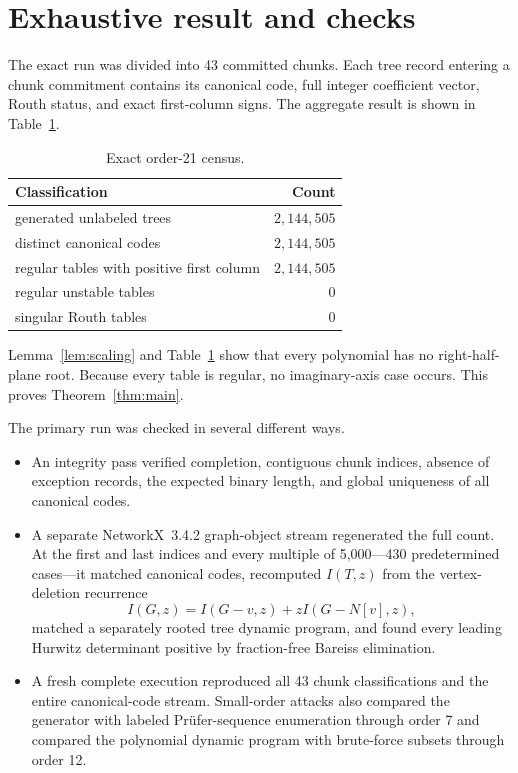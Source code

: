 \documentclass[11pt]{article}
\begin{document}
\section{Exhaustive result and checks}

The exact run was divided into 43 committed chunks.  Each tree record entering
a chunk commitment contains its canonical code, full integer coefficient
vector, Routh status, and exact first-column signs.  The aggregate result is
shown in Table~\ref{tab:census}.

\begin{table}[ht]
\centering
\begin{tabular}{lr}
\toprule
Classification & Count\\
\midrule
generated unlabeled trees & $2{,}144{,}505$\\
distinct canonical codes & $2{,}144{,}505$\\
regular tables with positive first column & $2{,}144{,}505$\\
regular unstable tables & $0$\\
singular Routh tables & $0$\\
\bottomrule
\end{tabular}
\caption{Exact order-21 census.}\label{tab:census}
\end{table}

Lemma~\ref{lem:scaling} and Table~\ref{tab:census} show that every polynomial
has no right-half-plane root.  Because every table is regular, no
imaginary-axis case occurs.  This proves Theorem~\ref{thm:main}.

The primary run was checked in several different ways.
\begin{itemize}
  \item An integrity pass verified completion, contiguous chunk indices,
  absence of exception records, the expected binary length, and global
  uniqueness of all canonical codes.
  \item A separate NetworkX~3.4.2 graph-object stream regenerated the full
  count.  At the first and last indices and every multiple of 5,000---430
  predetermined cases---it matched canonical codes, recomputed $I(T,z)$ from
  the vertex-deletion recurrence
  \[
      I(G,z)=I(G-v,z)+zI(G-N[v],z),
  \]
  matched a separately rooted tree dynamic program, and found every leading
  Hurwitz determinant positive by fraction-free Bareiss elimination.
  \item A fresh complete execution reproduced all 43 chunk classifications
  and the entire canonical-code stream.  Small-order attacks also compared
  the generator with labeled Prüfer-sequence enumeration through order 7 and
  compared the polynomial dynamic program with brute-force subsets through
  order 12.
\end{itemize}
\end{document}
